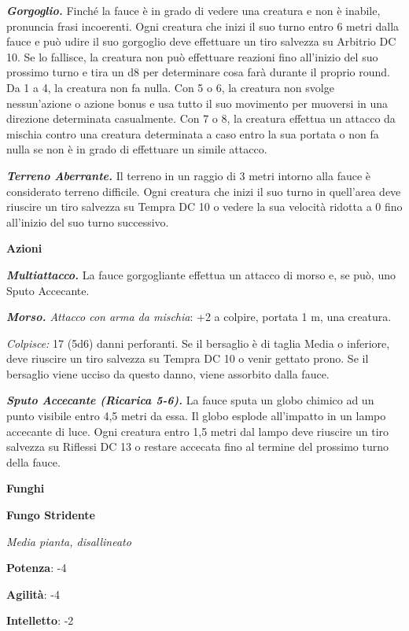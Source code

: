 \begin{multicols}{2}
\emph{\textbf{Gorgoglio.}} Finché la fauce è in grado di vedere una
creatura e non è inabile, pronuncia frasi incoerenti. Ogni creatura che
inizi il suo turno entro 6 metri dalla fauce e può udire il suo
gorgoglio deve effettuare un tiro salvezza su Arbitrio DC 10. Se lo
fallisce, la creatura non può effettuare reazioni fino all'inizio del
suo prossimo turno e tira un d8 per determinare cosa farà durante il
proprio round. Da 1 a 4, la creatura non fa nulla. Con 5 o 6, la
creatura non svolge nessun'azione o azione bonus e usa tutto il suo
movimento per muoversi in una direzione determinata casualmente. Con 7 o
8, la creatura effettua un attacco da mischia contro una creatura
determinata a caso entro la sua portata o non fa nulla se non è in grado
di effettuare un simile attacco.

\emph{\textbf{Terreno Aberrante.}} Il terreno in un raggio di 3 metri
intorno alla fauce è considerato terreno difficile. Ogni creatura che
inizi il suo turno in quell'area deve riuscire un tiro salvezza su Tempra
DC 10 o vedere la sua velocità ridotta a 0 fino all'inizio del suo turno
successivo.

\smallskip\textbf{Azioni}

\emph{\textbf{Multiattacco.}} La fauce gorgogliante effettua un attacco
di morso e, se può, uno Sputo Accecante.

\emph{\textbf{Morso.} Attacco con arma da mischia}: +2 a colpire,
portata 1 m, una creatura.

\emph{Colpisce:} 17 (5d6) danni perforanti. Se il bersaglio è di taglia
Media o inferiore, deve riuscire un tiro salvezza su Tempra DC 10 o venir
gettato prono. Se il bersaglio viene ucciso da questo danno, viene
assorbito dalla fauce.

\emph{\textbf{Sputo Accecante (Ricarica 5-6).}} La fauce sputa un globo
chimico ad un punto visibile entro 4,5 metri da essa. Il globo esplode
all'impatto in un lampo accecante di luce. Ogni creatura entro 1,5 metri
dal lampo deve riuscire un tiro salvezza su Riflessi DC 13 o restare
accecata fino al termine del prossimo turno della fauce.



\textbf{Funghi}

\textbf{Fungo Stridente}

\emph{Media pianta, disallineato}

\textbf{Potenza}: -4

\textbf{Agilità}: -4

\textbf{Intelletto}: -2


\end{multicols}
